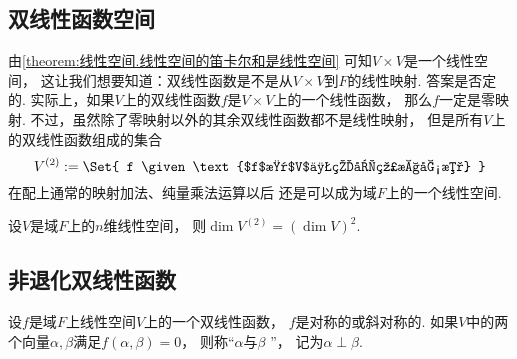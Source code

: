 \subsection{双线性函数空间}
由\cref{theorem:线性空间.线性空间的笛卡尔和是线性空间}
可知\(V \times V\)是一个线性空间，
这让我们想要知道：双线性函数是不是从\(V \times V\)到\(F\)的线性映射.
答案是否定的.
实际上，如果\(V\)上的双线性函数\(f\)是\(V \times V\)上的一个线性函数，
那么\(f\)一定是零映射.
不过，虽然除了零映射以外的其余双线性函数都不是线性映射，
但是所有\(V\)上的双线性函数组成的集合\begin{equation}
	V^{(2)}
	\defeq
	\Set{
		f
		\given
		\text{$f$是$V$上的双线性函数}
	}
\end{equation}
在配上通常的映射加法、纯量乘法运算以后
还是可以成为域\(F\)上的一个线性空间.

\begin{proposition}
设\(V\)是域\(F\)上的\(n\)维线性空间，
则\(\dim V^{(2)} = (\dim V)^2\).
\end{proposition}

\subsection{非退化双线性函数}
\begin{definition}
设\(f\)是域\(F\)上线性空间\(V\)上的一个双线性函数，
\(f\)是对称的或斜对称的.
如果\(V\)中的两个向量\(\alpha,\beta\)满足\(f(\alpha,\beta) = 0\)，
则称“\(\alpha\)与\(\beta\) ”，
记为\(\alpha \perp \beta\).
\end{definition}

